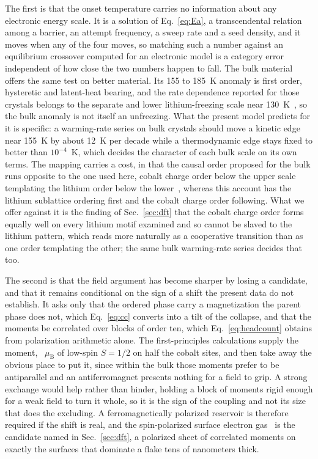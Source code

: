 \documentclass[reprint,twocolumn,prb,amsmath,amssymb,superscriptaddress,floatfix]{revtex4-2}
\newcommand{\muBs}{\mu_{\mathrm{B}}}
\begin{document}
The first is that the onset temperature carries no information about any electronic energy
scale. It is a solution of Eq.~\eqref{eq:Ea}, a transcendental relation among a barrier, an
attempt frequency, a sweep rate and a seed density, and it moves when any of the four moves, so
matching such a number against an equilibrium crossover computed for an electronic model is a
category error independent of how close the two numbers happen to fall. The bulk material offers
the same test on better material. Its 155 to 185~K anomaly is first order, hysteretic and
latent-heat bearing, and the rate dependence reported for those crystals belongs to the separate
and lower lithium-freezing scale near 130~K~\cite{Miyoshi2010,Motohashi2009}, so the bulk
anomaly is not itself an unfreezing. What the present model predicts for it is specific: a
warming-rate series on bulk crystals should move a kinetic edge near 155~K by about 12~K per
decade while a thermodynamic edge stays fixed to better than $10^{-4}$~K, which decides the
character of each bulk scale on its own terms. The mapping carries a cost, in that the causal
order proposed for the bulk runs opposite to the one used here, cobalt charge order
below the upper scale templating the lithium order below the lower~\cite{Miyoshi2010}, whereas
this account has the lithium sublattice ordering first and the cobalt charge order following.
What we offer against it is the finding of Sec.~\ref{sec:dft} that the cobalt charge order forms
equally well on every lithium motif examined and so cannot be slaved to the lithium pattern,
which reads more naturally as a cooperative transition than as one order templating the other;
the same bulk warming-rate series decides that too.

The second is that the field argument has become sharper by losing a candidate, and that it
remains conditional on the sign of a shift the present data do not establish. It asks only that
the ordered phase carry a magnetization the parent phase does not, which Eq.~\eqref{eq:cc}
converts into a tilt of the collapse, and that the moments be correlated over blocks of order
ten, which Eq.~\eqref{eq:headcount} obtains from polarization arithmetic alone. The
first-principles calculations supply the moment, \comomentRow~$\muBs$ of low-spin $S=1/2$ on
half the cobalt sites, and then take away the obvious place to put it, since within the bulk
those moments prefer to be antiparallel and an antiferromagnet presents nothing for a field to
grip. A strong exchange would help rather than hinder, holding a block of moments rigid enough
for a weak field to turn it whole, so it is the sign of the coupling and not its size that does
the excluding. A ferromagnetically polarized reservoir is therefore required if the shift is
real, and the spin-polarized surface electron gas~\cite{Radha2021} is the candidate named in
Sec.~\ref{sec:dft}, a polarized sheet of correlated moments on exactly the surfaces that
dominate a flake tens of nanometers thick.
\end{document}
